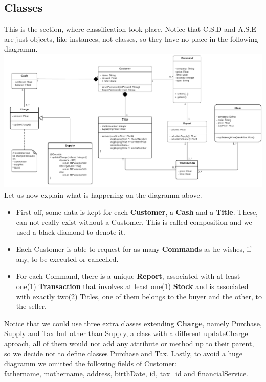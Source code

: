 \documentclass{article}
\begin{document}
\newpage
\subsection{Classes}
This is the section, where classification took place. Notice that C.S.D and A.S.E are just objects, like instances, not classes, so they have no place in the following diagramm.\\
\includegraphics[scale=0.25]{classes}
Let us now explain what is happening on the diagramm above.\\
\begin{itemize}
\item First off, some data is kept for each \textbf{Customer}, a \textbf{Cash} and a \textbf{Title}. 
These, can not really exist without a Customer. 
This is called composition and we used a black diamond to denote it.
\item Each Customer is able to request for as many \textbf{Command}s as he wishes, if any, to be executed or cancelled.
\item For each Command, there is a unique \textbf{Report}, associated with at least one(1) \textbf{Transaction} that involves at least one(1) \textbf{Stock} and is associated with exactly two(2) Titles, one of them belongs to the buyer and the other, to the seller. 
\end{itemize}
Notice that we could use three extra classes extending \textbf{Charge}, namely Purchase, Supply and Tax but other than Supply, a class with a different updateCharge aproach, all of them would not add any attribute or method up to their parent, so we decide not to define classes Purchase and Tax. Lastly, to avoid a huge diagramm we omitted the following fields of Customer:\\  
fathername, mothername, address, birthDate, id, tax{\_}id and financialService.
   
\newpage
\end{document}
